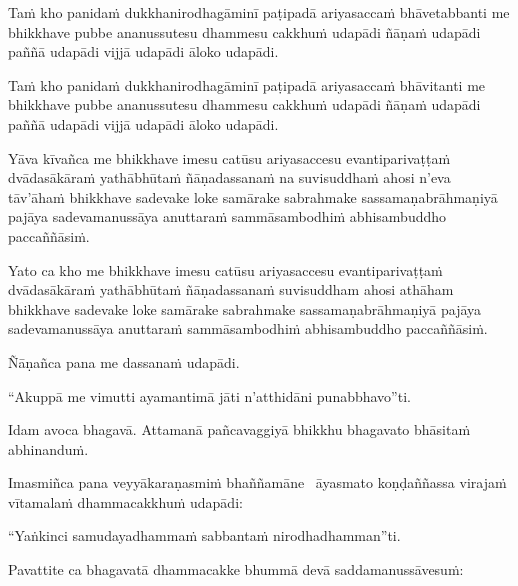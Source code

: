 \begin{pali-hang}
  Taṁ kho panidaṁ dukkhanirodhagāminī paṭipadā ariyasaccaṁ bhāvetabbanti me bhikkhave pubbe ananussutesu dhammesu cakkhuṁ udapādi ñāṇaṁ udapādi paññā udapādi vijjā udapādi āloko udapādi.
\end{pali-hang}

\begin{pali-hang}
  Taṁ kho panidaṁ dukkhanirodhagāminī paṭipadā ariyasaccaṁ bhāvitanti me bhikkhave pubbe ananussutesu dhammesu cakkhuṁ udapādi ñāṇaṁ udapādi paññā udapādi vijjā udapādi āloko udapādi.
\end{pali-hang}

\begin{pali-hang}
  Yāva kīvañca me bhikkhave imesu catūsu ariyasaccesu evantiparivaṭṭaṁ dvādasākāraṁ yathābhūtaṁ ñāṇadassanaṁ na suvisuddhaṁ ahosi n'eva tāv'āhaṁ bhikkhave sadevake loke samārake sabrahmake sassamaṇabrāhmaṇiyā pajāya sadevamanussāya anuttaraṁ sammāsambodhiṁ abhisambuddho paccaññāsiṁ.
\end{pali-hang}

\begin{pali-hang}
  Yato ca kho me bhikkhave imesu catūsu ariyasaccesu evantiparivaṭṭaṁ dvādasākāraṁ yathābhūtaṁ ñāṇadassanaṁ suvisuddham ahosi athāham bhikkhave sadevake loke samārake sabrahmake sassamaṇabrāhmaṇiyā pajāya sadevamanussāya anuttaraṁ sammāsambodhiṁ abhisambuddho paccaññāsiṁ.
\end{pali-hang}

Ñāṇañca pana me dassanaṁ udapādi.

\begin{pali-hang}
  ``Akuppā me vimutti ayamantimā jāti n'atthidāni punabbhavo''ti.
\end{pali-hang}

\begin{pali-hang}
  Idam avoca bhagavā. Attamanā pañcavaggiyā bhikkhu bhagavato bhāsitaṁ abhinanduṁ.
\end{pali-hang}

\begin{pali-hang}
  Imasmiñca pana veyyākaraṇasmiṁ bhaññamāne \breathmark\ āyasmato koṇḍaññassa virajaṁ vītamalaṁ dhammacakkhuṁ udapādi:
\end{pali-hang}

``Yaṅkinci samudayadhammaṁ sabbantaṁ nirodhadhamman''ti.

\begin{pali-hang}
  Pavattite ca bhagavatā dhammacakke bhummā devā saddamanussāvesuṁ:
\end{pali-hang}

